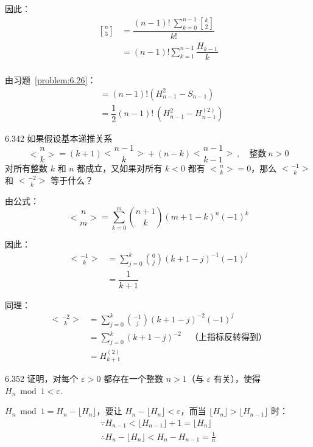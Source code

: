 因此：
\begin{align*}
  \genfrac{[}{]}{0pt}{} {n}{3} &= \dfrac{(n-1)! \ \sum_{k=0}^{n-1} \genfrac{[}{]}{0pt}{} {k}{2}}{k!} \\
  &= (n-1)! \sum_{k=1}^{n-1} \dfrac{H_{k-1}}{k} \\
\end{align*}

由习题~\ref{problem:6.26}：
\begin{align*}
  &= (n-1)! (H_{n-1}^2 - S_{n-1}) \\
  &= \dfrac{1}{2} (n-1)! \ (H_{n-1}^2 - H_{n-1}^{(2)})
\end{align*}

\begin{problem}{6.34}{2}
  如果假设基本递推关系
  \[
    \genfrac{<}{>}{0pt}{} {n}{k} = (k+1) \genfrac{<}{>}{0pt}{} {n-1}{k} + (n-k) \genfrac{<}{>}{0pt}{} {n-1}{k-1} \ , \quad \text{整数} \ n > 0
  \]
  对所有整数 \( k \) 和 \( n \) 都成立，又如果对所有 \( k < 0 \) 都有 \( \displaystyle\genfrac{<}{>}{0pt}{} {n}{k} = 0 \)，那么 \( \displaystyle\genfrac{<}{>}{0pt}{} {-1}{k} \) 和 \( \displaystyle\genfrac{<}{>}{0pt}{} {-2}{k} \) 等于什么？
\end{problem}

由公式：
\[
  \boxed{\genfrac{<}{>}{0pt}{} {n}{m} = \sum_{k=0}^m \binom{n+1}{k} (m+1-k)^n (-1)^k}
\]

因此：
\begin{align*}
  \genfrac{<}{>}{0pt}{} {-1}{k} &= \sum_{j=0}^k \binom{0}{j} (k+1-j)^{-1} (-1)^j \\
  &= \dfrac{1}{k+1}
\end{align*}

同理：
\begin{align*}
  \genfrac{<}{>}{0pt}{} {-2}{k} &= \sum_{j=0}^k \binom{-1}{j} (k+1-j)^{-2} (-1)^j \\
  &= \sum_{j=0}^k (k+1-j)^{-2} \quad \text{（上指标反转得到）} \\
  &= H_{k+1}^{(2)}
\end{align*}

\begin{problem}{6.35}{2}
  证明，对每个 \( \varepsilon > 0 \) 都存在一个整数 \( n > 1 \)（与 \( \varepsilon \) 有关），使得 \( H_n \bmod 1 < \varepsilon \).
\end{problem}

\( H_n \bmod 1 = H_n - \lfloor H_n \rfloor \)，要让 \( H_n - \lfloor H_n \rfloor < \varepsilon \)，而当 \( \lfloor H_n \rfloor > \lfloor H_{n-1} \rfloor \) 时：
\begin{align*}
  \because H_{n-1} < \lfloor H_{n-1} \rfloor + 1 = \lfloor H_n \rfloor \\
  \therefore H_n - \lfloor H_n \rfloor < H_n - H_{n-1} = \frac{1}{n} \\
\end{align*}

